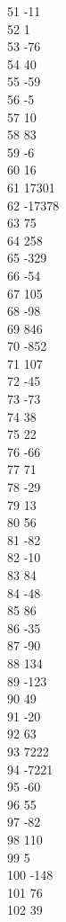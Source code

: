 { 51	-11 \\
 52	1 \\
 53	-76 \\
 54	40 \\
 55	-59 \\
 56	-5 \\
 57	10 \\
 58	83 \\
 59	-6 \\
 60	16 \\
 61	17301 \\
 62	-17378 \\
 63	75 \\
 64	258 \\
 65	-329 \\
 66	-54 \\
 67	105 \\
 68	-98 \\
 69	846 \\
 70	-852 \\
 71	107 \\
 72	-45 \\
 73	-73 \\
 74	38 \\
 75	22 \\
 76	-66 \\
 77	71 \\
 78	-29 \\
 79	13 \\
 80	56 \\
 81	-82 \\
 82	-10 \\
 83	84 \\
 84	-48 \\
 85	86 \\
 86	-35 \\
 87	-90 \\
 88	134 \\
 89	-123 \\
 90	49 \\
 91	-20 \\
 92	63 \\
 93	7222 \\
 94	-7221 \\
 95	-60 \\
 96	55 \\
 97	-82 \\
 98	110 \\
 99	5 \\
 100	-148 \\
 101	76 \\
 102	39 \\
}
